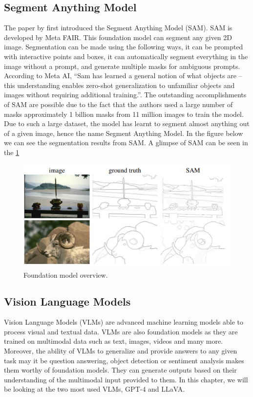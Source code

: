 \subsection{Segment Anything Model}
The paper by \citet{kirillov2023segment} first introduced the Segment Anything Model (SAM). SAM is developed by Meta FAIR. 
This foundation model can segment any given 2D image. Segmentation can be made using the following ways, 
it can be prompted with interactive points and boxes, it can automatically segment everything in the image without a prompt, 
and generate multiple masks for ambiguous prompts. According to Meta AI, “Sam has learned a general notion of what objects are – this understanding enables zero-shot generalization to 
unfamiliar objects and images without requiring additional training.”. The outstanding accomplishments of SAM are possible due to the fact that
the authors used a large number of masks approximately 1 billion masks from 11 million images to train the model. Due to such a large dataset, 
the model has learnt to segment almost anything out of a given image, hence the name Segment Anything Model. In the figure below we can see the segmentation results from SAM.
A glimpse of SAM can be seen in the \cref{fig:sam}
\begin{figure}[ht!]
    \centering
    \includegraphics[width=\textwidth]{content/images/SAM.png}
    \caption{Foundation model overview. \cite{kirillov2023segment}}
    \label{fig:sam}
\end{figure}
\subsection{Vision Language Models}
Vision Language Models (VLMs) are advanced machine learning models able to process visual and textual data. VLMs are also foundation models as they are trained on multimodal data such as text, images,
videos and many more. Moreover, the ability of VLMs to generalize and provide answers to any given task may it be question answering, object detection or sentiment analysis makes
them worthy of foundation models. They can generate outputs based on their understanding of the multimodal input provided to them. 
In this chapter, we will be looking at the two most used VLMs, GPT-4 and LLaVA.

